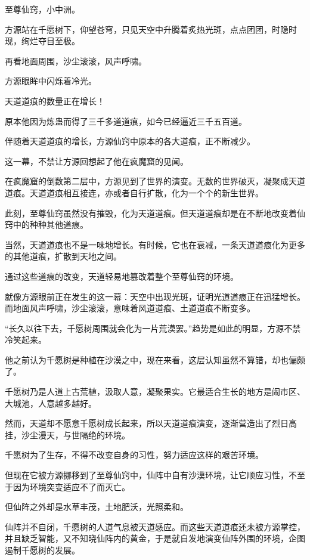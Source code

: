 
\begin{this_body}



至尊仙窍，小中洲。

方源站在千愿树下，仰望苍穹，只见天空中升腾着炙热光斑，点点团团，时隐时现，绚烂夺目至极。

再看地面周围，沙尘滚滚，风声呼啸。

方源眼眸中闪烁着冷光。

天道道痕的数量正在增长！

原本他因为炼蛊而得了三千多道道痕，如今已经逼近三千五百道。

伴随着天道道痕的增长，方源仙窍中原本的各大道痕，正不断减少。

这一幕，不禁让方源回想起了他在疯魔窟的见闻。

在疯魔窟的倒数第二层中，方源见到了世界的演变。无数的世界破灭，凝聚成天道道痕。天道道痕相互接连，亦或者自行扩散，化为一个个的新生世界。

此刻，至尊仙窍虽然没有摧毁，化为天道道痕。但天道道痕却是在不断地改变着仙窍中的种种其他道痕。

当然，天道道痕也不是一味地增长。有时候，它也在衰减，一条天道道痕化为更多的其他道痕，扩散到天地之间。

通过这些道痕的改变，天道轻易地篡改着整个至尊仙窍的环境。

就像方源眼前正在发生的这一幕：天空中出现光斑，证明光道道痕正在迅猛增长。而地面风声呼啸，沙尘滚滚，意味着风道道痕、土道道痕不断变多。

“长久以往下去，千愿树周围就会化为一片荒漠罢。”趋势是如此的明显，方源不禁冷笑起来。

他之前认为千愿树是种植在沙漠之中，现在来看，这层认知虽然不算错，却也偏颇了。

千愿树乃是人道上古荒植，汲取人意，凝聚果实。它最适合生长的地方是闹市区、大城池，人意越多越好。

然而，天道却不愿意千愿树成长起来，所以天道道痕演变，逐渐营造出了烈日高挂，沙尘漫天，与世隔绝的环境。

千愿树为了生存，不得不改变自身的习性，努力适应这样的艰苦环境。

但现在它被方源挪移到了至尊仙窍中，仙阵中自有沙漠环境，让它顺应习性，不至于因为环境突变适应不了而灭亡。

但仙阵之外却是水草丰茂，土地肥沃，光照柔和。

仙阵并不自闭，千愿树的人道气息被天道感应。而这些天道道痕还未被方源掌控，并且缺乏智能，又不知晓仙阵内的黄金，于是就自发地演变仙阵外围的环境，企图遏制千愿树的发展。


\end{this_body}
